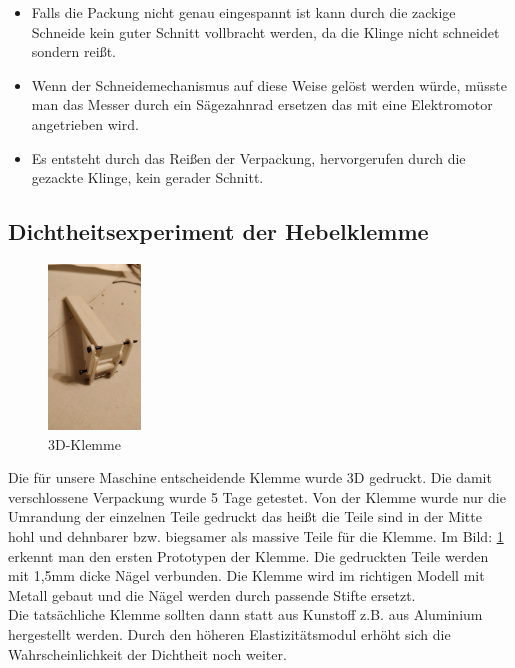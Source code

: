 \begin{itemize}
\item Falls die Packung nicht genau eingespannt ist kann durch die zackige Schneide kein guter Schnitt vollbracht werden, da die Klinge nicht schneidet sondern reißt.
\item Wenn der Schneidemechanismus auf diese Weise gelöst werden würde, müsste man das Messer durch ein Sägezahnrad ersetzen das mit eine Elektromotor angetrieben wird.
\item Es entsteht durch das Reißen der Verpackung, hervorgerufen durch die gezackte Klinge, kein gerader Schnitt.
\end{itemize} 

\newpage
\subsection{Dichtheitsexperiment der Hebelklemme}

\begin{figure}
\vspace{-20pt}
  \begin{center}
    \includegraphics[width=0.22\textwidth]{Bilder/Dichtheitsexperiment/Klemme}
  \end{center}
  \caption{3D-Klemme}
  \label{3D-Klemme}
  \vspace{-20pt}
\end{figure}

Die für unsere Maschine entscheidende Klemme wurde 3D gedruckt. Die damit verschlossene Verpackung wurde 5 Tage getestet. Von der Klemme wurde nur die Umrandung der einzelnen Teile gedruckt das heißt die Teile sind in der Mitte hohl und dehnbarer bzw. biegsamer als massive Teile für die Klemme. Im Bild: \ref{3D-Klemme} erkennt man den ersten Prototypen der Klemme. Die gedruckten Teile werden mit 1,5mm dicke Nägel verbunden. Die Klemme wird im richtigen Modell mit Metall gebaut und die Nägel werden durch passende Stifte ersetzt.\\ 
Die tatsächliche Klemme sollten dann statt aus Kunstoff z.B. aus Aluminium hergestellt werden. Durch den höheren Elastizitätsmodul erhöht sich die Wahrscheinlichkeit der Dichtheit noch weiter.

